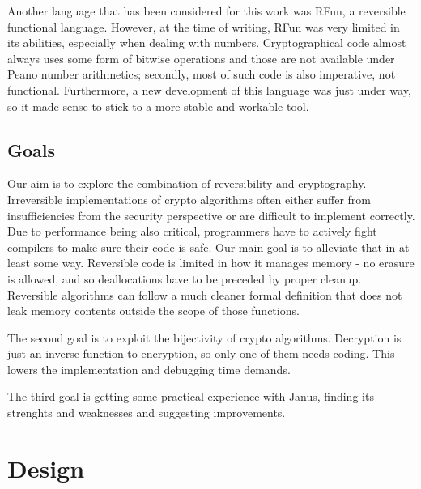 \documentclass[a4paper,10pt,openright]{memoir}
\begin{document}
Another language that has been considered for this work was RFun, a 
reversible functional language. However, at the time of writing, RFun 
was very limited in its abilities, especially when dealing with 
numbers. Cryptographical code almost always uses some form of bitwise 
operations and those are not available under Peano number arithmetics; 
secondly, most of such code is also imperative, not functional. 
Furthermore, a new development of this language was just under way, so 
it made sense to stick to a more stable and workable tool.


\section{Goals}
\label{sec:goals}

Our aim is to explore the combination of reversibility and 
cryptography. Irreversible implementations of crypto algorithms often 
either suffer from insufficiencies from the security perspective or are 
difficult to implement correctly. Due to performance being also 
critical, programmers have to actively fight compilers to make sure 
their code is safe. Our main goal is to alleviate that in at least some 
way. Reversible code is limited in how it manages memory - no erasure 
is allowed, and so deallocations have to be preceded by proper 
cleanup. Reversible algorithms can follow a much cleaner formal 
definition that does not leak memory contents outside the scope of 
those functions.

The second goal is to exploit the bijectivity of crypto algorithms. 
Decryption is just an inverse function to encryption, so only one of them 
needs coding. This lowers the implementation and debugging time demands.

The third goal is getting some practical experience with Janus, finding 
its strenghts and weaknesses and suggesting improvements.




\chapter{Design}

\end{document}
